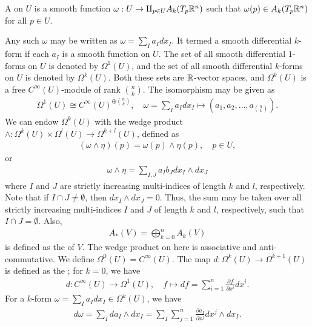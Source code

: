 \begin{definition}
    A  on $U$ is a smooth function $\omega:U \to \amalg_{p \in U} A_{k}(T_{p}\mathbb{R}^{n})$ such that $\omega(p) \in A_{k}(T_{p}\mathbb{R}^{n})$ for all $p \in U$.
\end{definition}
Any such $\omega$ may be written as $\omega = \sum_{I} a_{I} dx_{I}$. It termed a smooth differential $k$-form if each $a_{I}$ is a smooth function on $U$. The set of all smooth differential $1$-forms on $U$ is denoted by $\Omega^{1}(U)$, and the set of all smooth differential $k$-forms on $U$ is denoted by $\Omega^{k}(U)$. Both these sets are $\mathbb{R}$-vector spaces, and $\Omega^{k}(U)$ is a free $C^{\infty}(U)$-module of rank $\binom{n}{k}$. The isomorphism may be given as
\begin{align}
    \Omega^{1}(U) \cong C^{\infty}(U)^{\oplus \binom{n}{k}}, \quad \omega = \sum_{I} a_{I} dx_{I} \mapsto (a_{1},a_{2},\ldots,a_{\binom{n}{k}}).
\end{align}
We can endow $\Omega^{k}(U)$ with the wedge product $\wedge:\Omega^{k}(U) \times \Omega^{l}(U) \to \Omega^{k+l}(U)$, defined as
\begin{align}
    (\omega \wedge \eta)(p) = \omega(p) \wedge \eta(p), \quad p \in U,
\end{align}
or
\begin{align}
    \omega \wedge \eta = \sum_{I,J} a_{I}b_{J} dx_{I} \wedge dx_{J}
\end{align}
where $I$ and $J$ are strictly increasing multi-indices of length $k$ and $l$, respectively. Note that if $I \cap J \neq \emptyset$, then $dx_{I} \wedge dx_{J} = 0$. Thus, the sum may be taken over all strictly increasing multi-indices $I$ and $J$ of length $k$ and $l$, respectively, such that $I \cap J = \emptyset$. Also,
\begin{align}
    A_{\ast}(V) = \bigoplus_{k=0}^{n} A_{k}(V)
\end{align}
is defined as the  of $V$. The wedge product on here is associative and anti-commutative. We define $\Omega^{0}(U) = C^{\infty}(U)$. The map $d:\Omega^{k}(U) \to \Omega^{k+1}(U)$ is defined as the ; for $k = 0$, we have
\begin{align}
    d:C^{\infty}(U) \to \Omega^{1}(U), \quad f \mapsto df = \sum_{i=1}^{n} \frac{\partial f}{\partial x^{i}} dx^{i}.
\end{align}
For a $k$-form $\omega = \sum_{I} a_{I} dx_{I} \in \Omega^{k}(U)$, we have
\begin{align}
    d\omega = \sum_{I} da_{I} \wedge dx_{I} = \sum_{I} \sum_{j=1}^{n} \frac{\partial a_{I}}{\partial x^{j}} dx^{j} \wedge dx_{I}.
\end{align}
